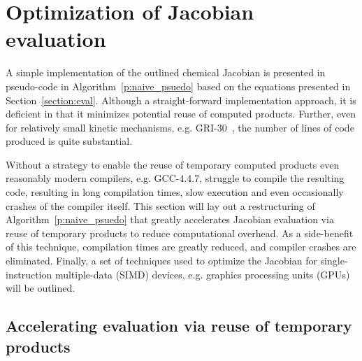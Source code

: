\documentclass[preprint,12pt]{elsarticle}
\begin{document}
\section{Optimization of Jacobian evaluation}

A simple implementation of the outlined chemical Jacobian is presented in pseudo-code in Algorithm~\eqref{p:naive_psuedo} based on the equations presented in Section~\ref{section:eval}.  
Although a straight-forward implementation approach, it is deficient in that it minimizes potential reuse of computed products.
Further, even for relatively small kinetic mechanisms, e.g. GRI-30~\cite{smith_gri-mech_30}, the number of lines of code produced is quite substantial.

Without a strategy to enable the reuse of temporary computed products even reasonably modern compilers, e.g. GCC-4.4.7, struggle to compile the resulting code, resulting in long compilation times, slow execution and even occasionally crashes of the compiler itself.
This section will lay out a restructuring of Algorithm~\eqref{p:naive_psuedo} that greatly accelerates Jacobian evaluation via reuse of temporary products to reduce computational overhead.
As a side-benefit of this technique, compilation times are greatly reduced, and compiler crashes are eliminated.
Finally, a set of techniques used to optimize the Jacobian for single-instruction multiple-data (SIMD) devices, e.g. graphics processing units (GPUs) will be outlined.

\subsection{Accelerating evaluation via reuse of temporary products}
\end{document}
